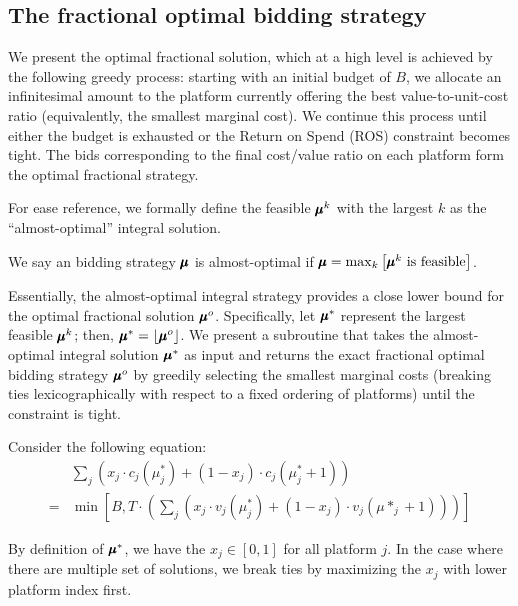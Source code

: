 \subsection{The fractional optimal bidding strategy}
{We present the optimal fractional solution, which at a high level is achieved by the following greedy process: starting with an initial budget of $B$, we allocate an infinitesimal amount to the platform currently offering the best value-to-unit-cost ratio (equivalently, the smallest marginal cost). We continue this process until either the budget is exhausted or the Return on Spend (ROS) constraint becomes tight. The bids corresponding to the final cost/value ratio on each platform form the optimal fractional strategy.

For ease reference, we formally define the feasible $\pmb{\mu}^k$ with the largest $k$ as the ``almost-optimal'' integral solution.
\begin{definition}\label{def:almostoptimal}
We say an bidding strategy $\pmb{\mu}$ is almost-optimal if $\pmb{\mu} = \max_{k}\left[\pmb{\mu}^k \text{ is feasible}\right]$.
\end{definition}

Essentially, the almost-optimal integral strategy provides a close lower bound for the optimal fractional solution $\mathbf{\pmb{\mu}}^o$. Specifically, let $\mathbf{\pmb{\mu}}^*$ represent the largest feasible $\pmb{\mu}^k$; then, $\mathbf{\pmb{\mu}}^* = \lfloor\mathbf{\pmb{\mu}}^o\rfloor$. We present a subroutine that takes the almost-optimal integral solution $\mathbf{\pmb{\mu}}^*$ as input and returns the exact fractional optimal bidding strategy $\mathbf{\pmb{\mu}}^o$ by greedily selecting the smallest marginal costs (breaking ties lexicographically with respect to a fixed ordering of platforms) until the constraint is tight.

Consider the following equation:
\begin{align}\label{eq:roundup}
    &\sum_{j}(x_j \cdot c_j(\mu^*_j) + (1 -x_j) \cdot c_j(\mu^*_j+1)) \nonumber\\
    = &\min\left[B, T \cdot \left(\sum_{j}(x_j \cdot v_j(\mu^*_j) + (1 -x_j) \cdot v_j(\mu*_j+1))\right)\right]
\end{align}


By definition of $\mathbf{\pmb{\mu}}^*$, we have the $x_j \in [0,1]$ for all platform $j$. In the case where there are multiple set of solutions, we break ties by maximizing the $x_j$ with lower platform index first.

}
